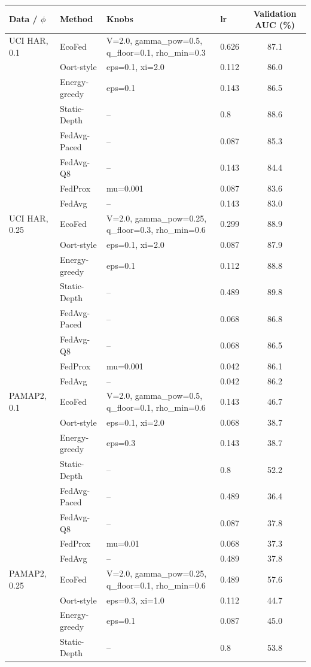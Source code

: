 \begin{tabular}{@{}llllc@{}}
\toprule
Data / $\phi$ & Method & Knobs & lr & Validation AUC (\%)\\
\midrule
UCI HAR, 0.1 & EcoFed & V=2.0, gamma\_pow=0.5, q\_floor=0.1, rho\_min=0.3 & 0.626 & 87.1\\
 & Oort-style & eps=0.1, xi=2.0 & 0.112 & 86.0\\
 & Energy-greedy & eps=0.1 & 0.143 & 86.5\\
 & Static-Depth & -- & 0.8 & 88.6\\
 & FedAvg-Paced & -- & 0.087 & 85.3\\
 & FedAvg-Q8 & -- & 0.143 & 84.4\\
 & FedProx & mu=0.001 & 0.087 & 83.6\\
 & FedAvg & -- & 0.143 & 83.0\\
\midrule
UCI HAR, 0.25 & EcoFed & V=2.0, gamma\_pow=0.25, q\_floor=0.3, rho\_min=0.6 & 0.299 & 88.9\\
 & Oort-style & eps=0.1, xi=2.0 & 0.087 & 87.9\\
 & Energy-greedy & eps=0.1 & 0.112 & 88.8\\
 & Static-Depth & -- & 0.489 & 89.8\\
 & FedAvg-Paced & -- & 0.068 & 86.8\\
 & FedAvg-Q8 & -- & 0.068 & 86.5\\
 & FedProx & mu=0.001 & 0.042 & 86.1\\
 & FedAvg & -- & 0.042 & 86.2\\
\midrule
PAMAP2, 0.1 & EcoFed & V=2.0, gamma\_pow=0.5, q\_floor=0.1, rho\_min=0.6 & 0.143 & 46.7\\
 & Oort-style & eps=0.1, xi=2.0 & 0.068 & 38.7\\
 & Energy-greedy & eps=0.3 & 0.143 & 38.7\\
 & Static-Depth & -- & 0.8 & 52.2\\
 & FedAvg-Paced & -- & 0.489 & 36.4\\
 & FedAvg-Q8 & -- & 0.087 & 37.8\\
 & FedProx & mu=0.01 & 0.068 & 37.3\\
 & FedAvg & -- & 0.489 & 37.8\\
\midrule
PAMAP2, 0.25 & EcoFed & V=2.0, gamma\_pow=0.25, q\_floor=0.1, rho\_min=0.6 & 0.489 & 57.6\\
 & Oort-style & eps=0.3, xi=1.0 & 0.112 & 44.7\\
 & Energy-greedy & eps=0.1 & 0.087 & 45.0\\
 & Static-Depth & -- & 0.8 & 53.8\\

\end{tabular}
